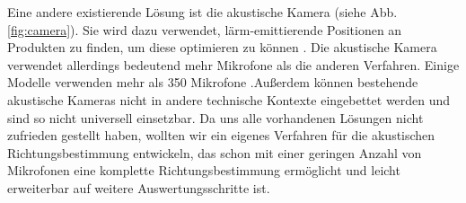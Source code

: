   Eine andere existierende Lösung ist die akustische Kamera (siehe Abb. \ref{fig:camera}). Sie wird dazu verwendet, lärm-emittierende Positionen an Produkten zu finden, um diese optimieren zu können \cite{camera}. Die akustische Kamera verwendet allerdings bedeutend mehr Mikrofone als die anderen Verfahren. Einige Modelle verwenden mehr als 350 Mikrofone \cite{nmics}.Außerdem können bestehende akustische Kameras nicht in andere technische Kontexte eingebettet werden und sind so nicht universell einsetzbar. Da uns alle vorhandenen Lösungen nicht zufrieden gestellt haben, wollten wir ein eigenes Verfahren für die akustischen Richtungsbestimmung entwickeln, das schon mit einer geringen Anzahl von Mikrofonen eine komplette Richtungsbestimmung ermöglicht und leicht erweiterbar auf weitere Auswertungsschritte ist.
